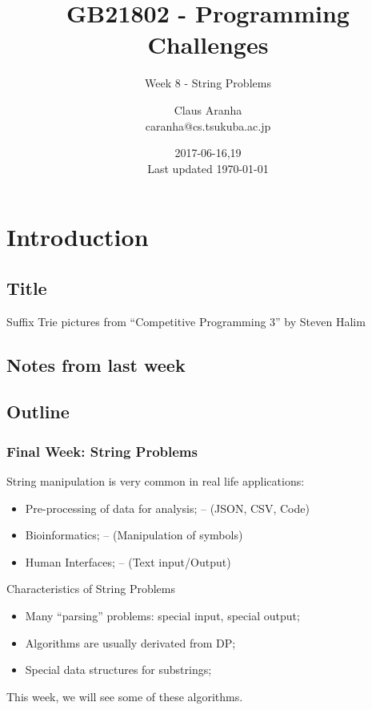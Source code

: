 \documentclass{beamer}
\title[GB21802]{GB21802 - Programming Challenges}
\subtitle[]{Week 8 - String Problems}
\author[Claus Aranha]{Claus Aranha\\{\footnotesize caranha@cs.tsukuba.ac.jp}}
\institute{College of Information Science}
\date{2017-06-16,19\\{\tiny Last updated \today}}
\begin{document}
\section{Introduction}
\subsection{Title}
\begin{frame}
\maketitle
\vfill

\hfill{\tiny Suffix Trie pictures from ``Competitive Programming 3'' by Steven Halim}
\end{frame}

\subsection{Notes from last week}


\subsection{Outline}

\begin{frame}
  \frametitle{Final Week: String Problems}
  {\smaller

    \begin{exampleblock}{}
      String manipulation is very common in real life applications:

      \begin{itemize}
      \item Pre-processing of data for analysis; -- (JSON, CSV, Code)
      \item Bioinformatics; -- (Manipulation of symbols)
      \item Human Interfaces; -- (Text input/Output)
      \end{itemize}
    \end{exampleblock}

    \begin{block}{Characteristics of String Problems}
      \begin{itemize}
      \item Many ``parsing'' problems: special input, special output;
      \item Algorithms are usually derivated from DP;
      \item Special data structures for substrings;
      \end{itemize}
    \end{block}

    This week, we will see some of these algorithms.
  }
\end{frame}
\end{document}
